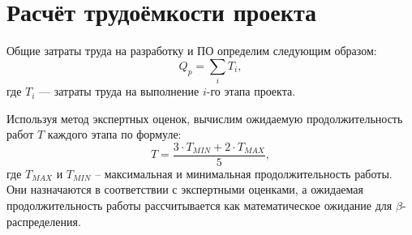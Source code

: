 \section{Расчёт трудоёмкости проекта} \label{economics_laboriousness}

Общие затраты труда на разработку и ПО определим следующим образом:
\begin{equation}
  \label{eq:common_laboriousness}
Q_p = \sum_{i} T_i,
\end{equation}
где $T_i$ --- затраты труда на выполнение $i$-го этапа проекта.

Используя метод экспертных оценок, вычислим ожидаемую продолжительность работ $T$ каждого этапа по формуле:
\begin{equation}
  \label{eq:work_duration}
T = \frac {3 \cdot T_{MIN} + 2 \cdot T_{MAX}} {5},
\end{equation}
где $T_{MAX}$ и $T_{MIN}$ – максимальная и минимальная продолжительность работы. Они назначаются в соответствии с экспертными оценками, а ожидаемая продолжительность работы рассчитывается как математическое ожидание для $\beta$- распределения.

